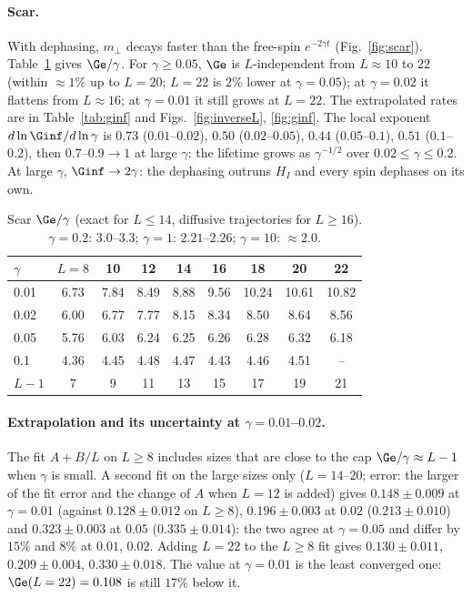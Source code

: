 \paragraph{Scar.} With dephasing, $m_\perp$ decays faster than the free-spin $e^{-2\gamma t}$ (Fig.~\ref{fig:scar}). Table~\ref{tab:scar} gives $\Ge/\gamma$. For $\gamma \ge 0.05$, $\Ge$ is $L$-independent from $L \approx 10$ to $22$ (within $\approx 1\%$ up to $L = 20$; $L = 22$ is $2\%$ lower at $\gamma = 0.05$); at $\gamma = 0.02$ it flattens from $L \approx 16$; at $\gamma = 0.01$ it still grows at $L = 22$. The extrapolated rates are in Table~\ref{tab:ginf} and Figs.~\ref{fig:inverseL}, \ref{fig:ginf}. The local exponent $d\ln\Ginf/d\ln\gamma$ is $0.73$ ($0.01$--$0.02$), $0.50$ ($0.02$--$0.05$), $0.44$ ($0.05$--$0.1$), $0.51$ ($0.1$--$0.2$), then $0.7$--$0.9 \to 1$ at large $\gamma$: the lifetime grows as $\gamma^{-1/2}$ over $0.02 \le \gamma \le 0.2$. At large $\gamma$, $\Ginf \to 2\gamma$: the dephasing outruns $H_I$ and every spin dephases on its own.

\begin{table}[H]
\centering
\begin{tabular}{lcccccccc}
\toprule
$\gamma$ & $L = 8$ & 10 & 12 & 14 & 16 & 18 & 20 & 22 \\
\midrule
0.01 & 6.73 & 7.84 & 8.49 & 8.88 & 9.56 & 10.24 & 10.61 & 10.82 \\
0.02 & 6.00 & 6.77 & 7.77 & 8.15 & 8.34 & 8.50 & 8.64 & 8.56 \\
0.05 & 5.76 & 6.03 & 6.24 & 6.25 & 6.26 & 6.28 & 6.32 & 6.18 \\
0.1  & 4.36 & 4.45 & 4.48 & 4.47 & 4.43 & 4.46 & 4.51 & -- \\
\midrule
$L - 1$ & 7 & 9 & 11 & 13 & 15 & 17 & 19 & 21 \\
\bottomrule
\end{tabular}
\caption{Scar $\Ge/\gamma$ (exact for $L\le14$, diffusive trajectories for $L \ge 16$). $\gamma = 0.2$: $3.0$--$3.3$; $\gamma = 1$: $2.21$--$2.26$; $\gamma = 10$: $\approx 2.0$.}
\label{tab:scar}
\end{table}

\paragraph{Extrapolation and its uncertainty at $\gamma = 0.01$--$0.02$.} The fit $A + B/L$ on $L \ge 8$ includes sizes that are close to the cap $\Ge/\gamma \approx L - 1$ when $\gamma$ is small. A second fit on the large sizes only ($L = 14$--$20$; error: the larger of the fit error and the change of $A$ when $L = 12$ is added) gives $0.148 \pm 0.009$ at $\gamma = 0.01$ (against $0.128 \pm 0.012$ on $L \ge 8$), $0.196 \pm 0.003$ at $0.02$ ($0.213 \pm 0.010$) and $0.323 \pm 0.003$ at $0.05$ ($0.335 \pm 0.014$): the two agree at $\gamma = 0.05$ and differ by $15\%$ and $8\%$ at $0.01$, $0.02$. Adding $L = 22$ to the $L \ge 8$ fit gives $0.130 \pm 0.011$, $0.209 \pm 0.004$, $0.330 \pm 0.018$. The value at $\gamma = 0.01$ is the least converged one: $\Ge(L = 22) = 0.108$ is still $17\%$ below it.

